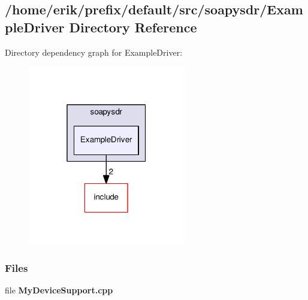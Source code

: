 \subsection{/home/erik/prefix/default/src/soapysdr/\+Example\+Driver Directory Reference}
\label{dir_caa7f3da7a078f27cd8741b25d472a96}
Directory dependency graph for Example\+Driver\+:
\nopagebreak
\begin{figure}[H]
\begin{center}
\leavevmode
\includegraphics[width=194pt]{dir_caa7f3da7a078f27cd8741b25d472a96_dep}
\end{center}
\end{figure}
\subsubsection*{Files}
\begin{DoxyCompactItemize}
\item 
file {\bf My\+Device\+Support.\+cpp}
\end{DoxyCompactItemize}
